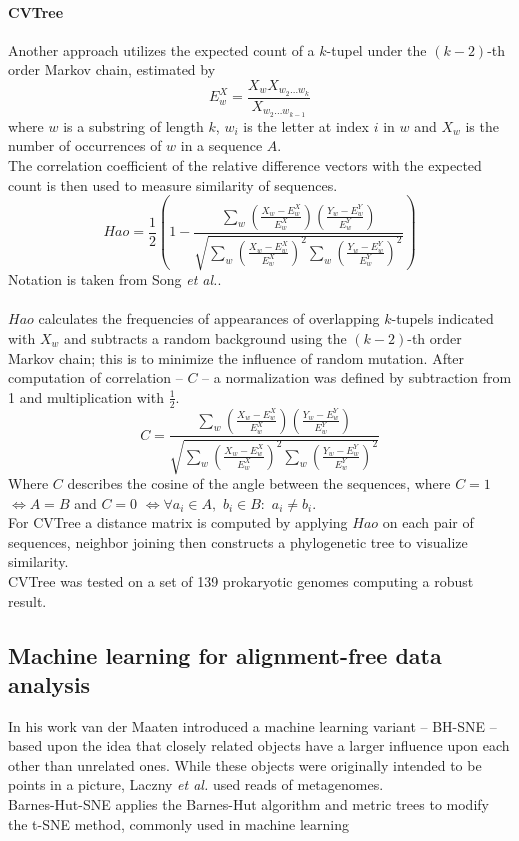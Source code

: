 \documentclass[twocolumn]{bmcart}%
\begin{document}
\paragraph*{CVTree}
Another approach utilizes the expected count of a $k$-tupel under the $(k-2)$-th order Markov chain, estimated by 
$$E_w^X=\frac{X_wX_{w_2\dots w_k}}{X_{w_2\dots w_{k-1}}}$$
where $w$ is a substring of length $k$, $w_i$ is the letter at index $i$ in $w$ and $X_w$ is the number of occurrences of $w$ in a sequence $A$.\\
The correlation coefficient of the relative difference vectors with the expected count is then used to measure similarity of sequences.
$$Hao=\frac{1}{2}\left(1-\frac{\sum_w\left(\frac{X_w-E_w^X}{E_w^X}\right)\left(\frac{Y_w-E_w^Y}{E_w^Y}\right)}{\sqrt{\sum_w\left(\frac{X_w-E_w^X}{E_w^X}\right)^2\sum_w\left(\frac{Y_w-E_w^Y}{E_w^Y}\right)^2}}\right)$$
Notation is taken from Song \textit{et al.}\cite{doi:10.1093/bib/bbt067}.\\
\\
$Hao$ calculates the frequencies of appearances of overlapping $k$-tupels indicated with $X_w$ and subtracts a random background using the $(k-2)$-th order Markov chain; this is to minimize the influence of random mutation. After computation of correlation -- $C$ -- a normalization was defined by subtraction from 1 and multiplication with $\frac{1}{2} $.
$$C=\frac{\sum_w\left(\frac{X_w-E_w^X}{E_w^X}\right)\left(\frac{Y_w-E_w^Y}{E_w^Y}\right)}{\sqrt{\sum_w\left(\frac{X_w-E_w^X}{E_w^X}\right)^2\sum_w\left(\frac{Y_w-E_w^Y}{E_w^Y}\right)^2}}$$
Where $C$ describes the cosine of the angle between the sequences, where $C=1$ $\Leftrightarrow A=B$ and $C=0$ $\Leftrightarrow \forall a_i \in A,$ $b_i \in B:$ $a_i \neq b_i$. \\
For CVTree a distance matrix is computed by applying $Hao$ on each pair of sequences, neighbor joining then constructs a phylogenetic tree to visualize similarity.\\
CVTree was tested on a set of 139 prokaryotic genomes computing a robust result\cite{qi2004cvtree}. 
\subsection*{Machine learning for alignment-free data analysis}
In his work van der Maaten\cite{DBLP:journals/corr/abs-1301-3342} introduced a machine learning variant -- BH-SNE --  based upon the idea that closely related objects have a larger influence upon each other than unrelated ones. While these objects were originally intended to be points in a picture, Laczny \textit{et al.}\cite{Laczny2014} used reads of metagenomes.\\
Barnes-Hut-SNE applies the Barnes-Hut algorithm and metric trees to modify the t-SNE method, commonly used in machine learning
\end{document}
